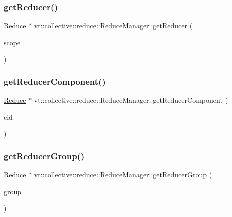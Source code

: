 \subsubsection{\texorpdfstring{get\+Reducer()}{getReducer()}}
{\footnotesize\ttfamily \hyperlink{structvt_1_1collective_1_1reduce_1_1_reduce}{Reduce} $\ast$ vt\+::collective\+::reduce\+::\+Reduce\+Manager\+::get\+Reducer (\begin{DoxyParamCaption}\item[{\hyperlink{structvt_1_1collective_1_1reduce_1_1detail_1_1_reduce_scope}{detail\+::\+Reduce\+Scope} const \&}]{scope }\end{DoxyParamCaption})}

\mbox{\label{structvt_1_1collective_1_1reduce_1_1_reduce_manager_ae154a987a32dfa8c86e0391a2915579d}} 
\subsubsection{\texorpdfstring{get\+Reducer\+Component()}{getReducerComponent()}}
{\footnotesize\ttfamily \hyperlink{structvt_1_1collective_1_1reduce_1_1_reduce}{Reduce} $\ast$ vt\+::collective\+::reduce\+::\+Reduce\+Manager\+::get\+Reducer\+Component (\begin{DoxyParamCaption}\item[{\hyperlink{namespacevt_ab6ac935c168b809c422d5121da4f2700}{Component\+I\+D\+Type} const \&}]{cid }\end{DoxyParamCaption})}

\mbox{\label{structvt_1_1collective_1_1reduce_1_1_reduce_manager_afedfe0dbb9fcbe6120a310ac8f4ad9b0}} 
\subsubsection{\texorpdfstring{get\+Reducer\+Group()}{getReducerGroup()}}
{\footnotesize\ttfamily \hyperlink{structvt_1_1collective_1_1reduce_1_1_reduce}{Reduce} $\ast$ vt\+::collective\+::reduce\+::\+Reduce\+Manager\+::get\+Reducer\+Group (\begin{DoxyParamCaption}\item[{\hyperlink{namespacevt_a27b5e4411c9b6140c49100e050e2f743}{Group\+Type} const \&}]{group }\end{DoxyParamCaption})}

